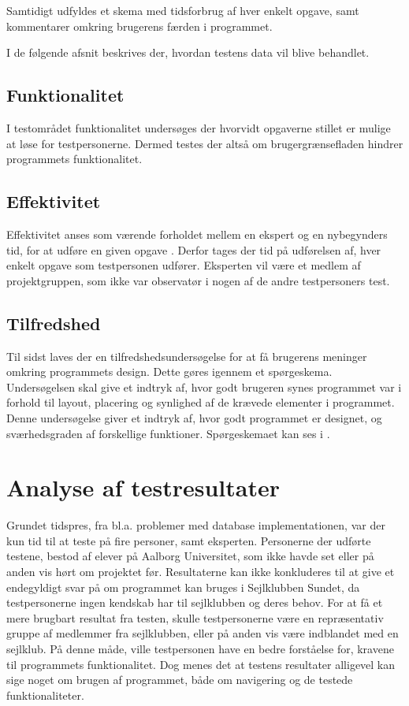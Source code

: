 Samtidigt udfyldes et skema med tidsforbrug af hver enkelt opgave, samt kommentarer omkring brugerens færden i programmet.

I de følgende afsnit beskrives der, hvordan testens data vil blive behandlet.

\subsection{Funktionalitet}
I testområdet funktionalitet undersøges der hvorvidt opgaverne stillet er mulige at løse for testpersonerne.
Dermed testes der altså om brugergrænsefladen hindrer programmets funktionalitet. 

\subsection{Effektivitet}
Effektivitet anses som værende forholdet mellem en ekspert og en nybegynders tid, for at udføre en given opgave \citep{UIEffeciency}.
Derfor tages der tid på udførelsen af, hver enkelt opgave som testpersonen udfører.
Eksperten vil være et medlem af projektgruppen, som ikke var observatør i nogen af de andre testpersoners test. 

\subsection{Tilfredshed}
Til sidst laves der en tilfredshedsundersøgelse for at få brugerens meninger omkring programmets design. 
Dette gøres igennem et spørgeskema. 
Undersøgelsen skal give et indtryk af, hvor godt brugeren synes programmet var i forhold til layout, placering og synlighed af de krævede elementer i programmet. 
Denne undersøgelse giver et indtryk af, hvor godt programmet er designet, og sværhedsgraden af forskellige funktioner. 
Spørgeskemaet kan ses i . \citep{UISatisfaction}


\section{Analyse af testresultater}

Grundet tidspres, fra bl.a. problemer med database implementationen, var der kun tid til at teste på fire personer, samt eksperten.
Personerne der udførte testene, bestod af elever på Aalborg Universitet, som ikke havde set eller på anden vis hørt om projektet før.
Resultaterne kan ikke konkluderes til at give et endegyldigt svar på om programmet kan bruges i Sejlklubben Sundet, da testpersonerne ingen kendskab har til sejlklubben og deres behov.
For at få et mere brugbart resultat fra testen, skulle testpersonerne være en repræsentativ gruppe af medlemmer fra sejlklubben, eller på anden vis være indblandet med en sejlklub. 
På denne måde, ville testpersonen have en bedre forståelse for, kravene til programmets funktionalitet.
Dog menes det at testens resultater alligevel kan sige noget om brugen af programmet, både om navigering og de testede funktionaliteter.
